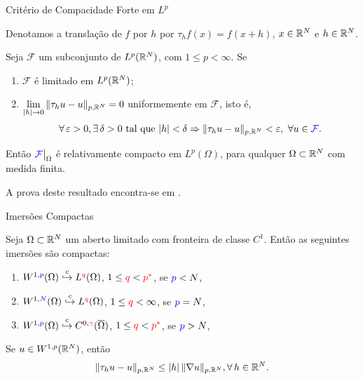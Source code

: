 
\begin{frame}{Critério de Compacidade Forte em \(L^p\)}

Denotamos a {\color{blue}translação de \(f\) por \(h\)} por \(\tau_hf(x)=f(x+h)\), \(x\in \mathbb{R}^N\) e \(h\in \mathbb{R}^N\).



\begin{teo}
Seja {\color{blue}\(\mathcal{F}\)} um subconjunto de \(L^p(\mathbb{R}^N)\), com \(1\leq p<\infty\). Se 
\begin{enumerate}
\item  {\color{blue}\(\mathcal{F}\)} é {\color{blue}limitado} em \(L^p(\mathbb{R}^N)\);
\item \(\lim\limits_{|h|\to 0}\|\tau_hu-u\|_{p,\mathbb{R}^N}=0\) {\color{blue}uniformemente} em {\color{blue}\(\mathcal{F}\)}, isto é, 
\[\forall\, \varepsilon>0, \exists\, \delta>0 \text{ tal que } |h|<\delta \Rightarrow \|\tau_hu-u\|_{p,\mathbb{R}^N}<\varepsilon,\ \forall u\in {\color{blue}\mathcal{F}}.\]
\end{enumerate}
Então \({\color{blue}\mathcal{F}}\big\vert_\Omega\) é {\color{red}relativamente compacto} em \(L^p(\Omega)\), para qualquer \(\Omega\subset \mathbb{R}^N\) com {\color{red}medida finita}. 
\end{teo}

A prova deste resultado encontra-se em  \cite[Theorem 4.26]{brezis}.
\end{frame}



\begin{frame}{Imersões Compactas}

\begin{teo}
Seja \(\Omega \subset \mathbb{R}^N\) um aberto {\color{blue}limitado} com {\color{red}fronteira de classe \(C^1\)}. Então as seguintes imersões são compactas:
\begin{enumerate}
\item \(W^{1,{\color{blue}p}}(\Omega)\stackrel{c}{\hookrightarrow} L^{\color{red}q}(\Omega) \), \(1\leq {\color{red}q} <{\color{red}p^\ast}\), se \({\color{blue}p}<N\),
\item \(W^{1,{\color{blue}N}}(\Omega)\stackrel{c}{\hookrightarrow} L^{\color{red}q}(\Omega) \), \(1\leq {\color{red}q} <\infty\), se \({\color{blue}p}=N\),
\item \(W^{1,{\color{blue}p}}(\Omega)\stackrel{c}{\hookrightarrow} C^{0,{\color{red}\gamma}}(\overline{\Omega}) \), \(1\leq {\color{red}q} <{\color{red}p^\ast}\), se \({\color{blue}p}>N\),
\end{enumerate}
\end{teo}

\begin{lemaaux}
Se \(u\in W^{1,p}(\mathbb{R}^N)\), então 
\[\|\tau_hu-u\|_{p,\mathbb{R}^N}\leq |h|\,\|\nabla u\|_{p,\mathbb{R}^N}, \forall\, h\in \mathbb{R}^N. \]
\end{lemaaux}

\end{frame}

